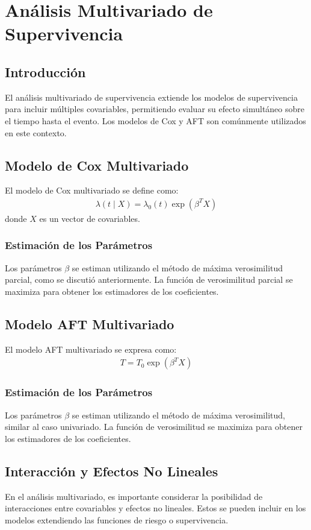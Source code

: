 \documentclass[a4paper]{report} %
\begin{document}
\chapter{An\'alisis Multivariado de Supervivencia}

\section{Introducci\'on}
El an\'alisis multivariado de supervivencia extiende los modelos de supervivencia para incluir m\'ultiples covariables, permitiendo evaluar su efecto simult\'aneo sobre el tiempo hasta el evento. Los modelos de Cox y AFT son com\'unmente utilizados en este contexto.

\section{Modelo de Cox Multivariado}
El modelo de Cox multivariado se define como:
\begin{eqnarray*}
\lambda(t \mid X) = \lambda_0(t) \exp(\beta^T X)
\end{eqnarray*}
donde $X$ es un vector de covariables.

\subsection{Estimaci\'on de los Par\'ametros}
Los par\'ametros $\beta$ se estiman utilizando el m\'etodo de m\'axima verosimilitud parcial, como se discuti\'o anteriormente. La funci\'on de verosimilitud parcial se maximiza para obtener los estimadores de los coeficientes.

\section{Modelo AFT Multivariado}
El modelo AFT multivariado se expresa como:
\begin{eqnarray*}
T = T_0 \exp(\beta^T X)
\end{eqnarray*}

\subsection{Estimaci\'on de los Par\'ametros}
Los par\'ametros $\beta$ se estiman utilizando el m\'etodo de m\'axima verosimilitud, similar al caso univariado. La funci\'on de verosimilitud se maximiza para obtener los estimadores de los coeficientes.

\section{Interacci\'on y Efectos No Lineales}
En el an\'alisis multivariado, es importante considerar la posibilidad de interacciones entre covariables y efectos no lineales. Estos se pueden incluir en los modelos extendiendo las funciones de riesgo o supervivencia.
\end{document}
